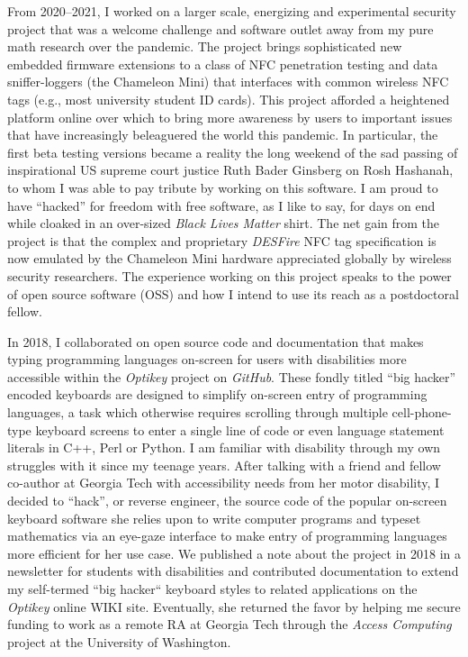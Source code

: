 \documentclass[10pt,reqno,letterpaper]{article}
\theoremstyle{plain}
\numberwithin{theorem}{section}
\theoremstyle{definition}
\begin{document}
From 2020--2021, I worked on a larger scale, energizing and experimental 
security project that was a welcome challenge and software outlet away 
from my pure math research over the pandemic. 
The project brings sophisticated new 
embedded firmware extensions to a class of NFC penetration testing and 
data sniffer-loggers 
(the Chameleon Mini) that interfaces with common wireless NFC tags (e.g., most university student ID cards). 
This project afforded a heightened platform online 
over which to bring 
more awareness by users to important issues 
that have increasingly beleaguered the world this pandemic. 
In particular, the first beta testing versions became a reality 
the long weekend of the sad passing of inspirational 
US supreme court justice Ruth Bader Ginsberg on 
Rosh Hashanah, to whom I was able to pay tribute by working on this software. 
I am proud to have ``hacked'' for freedom with free software, as I like to say, for days on end 
while cloaked in an over-sized \emph{Black Lives Matter} shirt. 
The net gain from the project is that the complex and proprietary \emph{DESFire} NFC tag
specification is now emulated by the Chameleon Mini hardware appreciated globally by 
wireless security researchers.  
The experience working on this project speaks to the power of 
open source software (OSS) and how I intend to use its reach as a postdoctoral fellow.


In 2018, I collaborated on open source code and documentation that makes typing 
programming languages on-screen for users 
with disabilities more accessible within the \emph{Optikey} project on \emph{GitHub}. 
These fondly titled ``big hacker'' encoded 
keyboards are designed to simplify on-screen entry 
of programming languages, a task which otherwise requires scrolling through multiple cell-phone-type 
keyboard screens to enter a single line of code or even 
language statement literals in C++, Perl or Python. 
I am familiar with disability through my own struggles with it since my teenage years. 
After talking with a friend and fellow co-author at Georgia Tech with accessibility needs from her motor 
disability, I decided to ``hack'', or reverse engineer, 
the source code of the popular on-screen keyboard software she 
relies upon to write computer programs and typeset mathematics via an eye-gaze interface to make entry of 
programming languages more efficient for her use case. 
We published a note about the project in 2018 in a newsletter for students with disabilities and 
contributed documentation to extend my self-termed ``big hacker`` keyboard styles to related 
applications on the \emph{Optikey} online WIKI site. 
Eventually, she returned the favor by helping me secure funding to work as a remote 
RA at Georgia Tech through the \emph{Access Computing} project at the University of Washington. 
\end{document}
